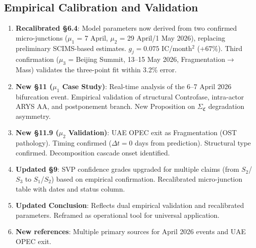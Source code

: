 \documentclass[12pt,a4paper]{article}
\newcommand{\gj}{g_j}
\newcommand{\SigmaCF}{\Sigma_{\mathfrak{C}}}  %
\begin{document}
\subsection*{Empirical Calibration and Validation}

\begin{enumerate}[label=\textbf{\arabic*.},resume]
    \item \textbf{Recalibrated §6.4}: Model parameters now derived from two confirmed micro-junctions ($\mu_1$ = 7 April, $\mu_2$ = 29 April/1 May 2026), replacing preliminary SCIMS-based estimates. $\gj = 0.075$ IC/month$^2$ ($+67\%$). Third confirmation ($\mu_3$ = Beijing Summit, 13--15 May 2026, Fragmentation$\to$Mass) validates the three-point fit within 3.2\% error.
    \item \textbf{New §11 ($\mu_1$ Case Study)}: Real-time analysis of the 6--7 April 2026 bifurcation event. Empirical validation of structural Controfase, intra-actor ARYS AA, and postponement branch. New Proposition on $\SigmaCF$ degradation asymmetry.
    \item \textbf{New §11.9 ($\mu_2$ Validation)}: UAE OPEC exit as Fragmentation (OST pathology). Timing confirmed ($\Delta t = 0$ days from prediction). Structural type confirmed. Decomposition cascade onset identified.
    \item \textbf{Updated §9}: SVP confidence grades upgraded for multiple claims (from $S_2$/$S_3$ to $S_1$/$S_2$) based on empirical confirmation. Recalibrated micro-junction table with dates and status column.
    \item \textbf{Updated Conclusion}: Reflects dual empirical validation and recalibrated parameters. Reframed as operational tool for universal application.
    \item \textbf{New references}: Multiple primary sources for April 2026 events and UAE OPEC exit.
\end{enumerate}


\end{document}
